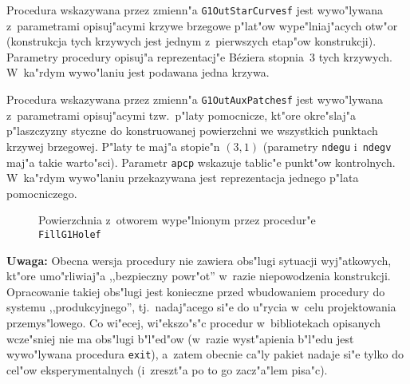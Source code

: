 \begin{sloppypar}
Procedura wskazywana przez zmienn"a \texttt{G1OutStarCurvesf} jest
wywo"lywana z~parametrami opisuj"acymi krzywe brzegowe p"lat"ow
wype"lniaj"acych otw"or (konstrukcja tych krzywych jest jednym z~pierwszych
etap"ow konstrukcji). Parametry procedury opisuj"a reprezentacj"e
B\'{e}ziera stopnia~$3$ tych krzywych. W~ka"rdym wywo"laniu jest podawana
jedna krzywa.
\end{sloppypar}

\begin{sloppypar}
Procedura wskazywana przez zmienn"a \texttt{G1OutAuxPatchesf} jest
wywo"lywana z~parametrami opisuj"acymi tzw.\ p"laty pomocnicze, kt"ore
okre"slaj"a p"laszczyzny styczne do konstruowanej powierzchni we wszystkich
punktach krzywej brzegowej. P"laty te maj"a stopie"n $(3,1)$
(parametry \texttt{ndegu} i~\texttt{ndegv} maj"a takie warto"sci).
Parametr \texttt{apcp} wskazuje tablic"e punkt"ow kontrolnych. W~ka"rdym
wywo"laniu przekazywana jest reprezentacja jednego p"lata pomocniczego.
\end{sloppypar}%
\begin{figure}[ht]
  \centerline{}
  \caption{\label{fig:g1:patch:num:2}Powierzchnia z~otworem wype"lnionym
    przez procedur"e \texttt{FillG1Holef}}
\end{figure}

\vspace{\medskipamount}
\noindent\textbf{Uwaga:}
Obecna wersja procedury nie zawiera obs"lugi sytuacji wyj"atkowych, kt"ore
umo"rliwiaj"a ,,bezpieczny powr"ot'' w~razie niepowodzenia konstrukcji.
Opracowanie takiej obs"lugi jest konieczne przed wbudowaniem procedury do
systemu ,,produkcyjnego'', tj.\ nadaj"acego si"e do u"rycia w~celu
projektowania przemys"lowego. Co wi"ecej, wi"ekszo"s"c procedur
w~bibliotekach opisanych wcze"sniej nie ma obs"lugi b"l"ed"ow (w~razie
wyst"apienia b"l"edu jest wywo"lywana procedura \texttt{exit}), a~zatem
obecnie ca"ly pakiet nadaje si"e tylko do cel"ow eksperymentalnych
(i~zreszt"a po to go zacz"a"lem pisa"c).


